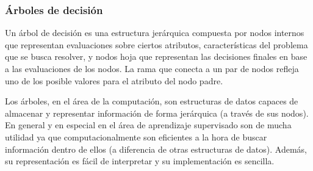 \subsubsection{Árboles de decisión}
\label{subsection:arboles_decision}




	Un árbol de decisión es una estructura jerárquica compuesta por nodos internos que representan evaluaciones sobre ciertos atributos, características del problema que se busca resolver, y nodos hoja que representan las decisiones finales en base a las evaluaciones de los nodos. La rama que conecta a un par de nodos refleja uno de los posible valores para el atributo del nodo padre.
	
	Los árboles, en el área de la computación, son estructuras de datos capaces de almacenar y representar información de forma jerárquica (a través de sus nodos). En general y en especial en el área de aprendizaje supervisado son de mucha utilidad ya que computacionalmente son eficientes a la hora de buscar información dentro de ellos (a diferencia de otras estructuras de datos). Además, su representación es fácil de interpretar y su implementación es sencilla.

